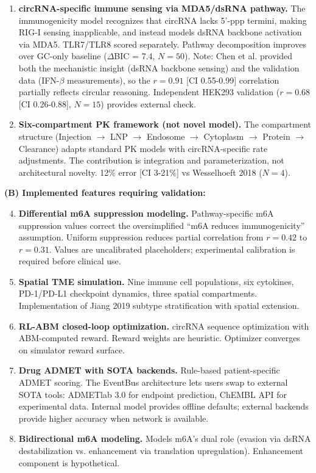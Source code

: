 \documentclass[11pt,a4paper]{article}
\begin{document}
\begin{enumerate}
\item \textbf{circRNA-specific immune sensing via MDA5/dsRNA pathway.} The immunogenicity model recognizes that circRNA lacks 5'-ppp termini, making RIG-I sensing inapplicable, and instead models dsRNA backbone activation via MDA5. TLR7/TLR8 scored separately. Pathway decomposition improves over GC-only baseline ($\Delta$BIC = 7.4, $N=50$). Note: Chen et al. \citep{chen2019} provided both the mechanistic insight (dsRNA backbone sensing) and the validation data (IFN-$\beta$ measurements), so the $r=0.91$ [CI 0.55-0.99] correlation partially reflects circular reasoning. Independent HEK293 validation ($r=0.68$ [CI 0.26-0.88], $N=15$) provides external check.

\item \textbf{Six-compartment PK framework (not novel model).} The compartment structure (Injection $\rightarrow$ LNP $\rightarrow$ Endosome $\rightarrow$ Cytoplasm $\rightarrow$ Protein $\rightarrow$ Clearance) adapts standard PK models with circRNA-specific rate adjustments. The contribution is integration and parameterization, not architectural novelty. 12\% error [CI 3-21\%] vs Wesselhoeft 2018 ($N=4$).
\end{enumerate}

\textbf{(B) Implemented features requiring validation:}

\begin{enumerate}
\setcounter{enumi}{3}
\item \textbf{Differential m6A suppression modeling.} Pathway-specific m6A suppression values correct the oversimplified ``m6A reduces immunogenicity'' assumption. Uniform suppression reduces partial correlation from $r=0.42$ to $r=0.31$. Values are uncalibrated placeholders; experimental calibration is required before clinical use.

\item \textbf{Spatial TME simulation.} Nine immune cell populations, six cytokines, PD-1/PD-L1 checkpoint dynamics, three spatial compartments. Implementation of Jiang 2019 subtype stratification with spatial extension.

\item \textbf{RL-ABM closed-loop optimization.} circRNA sequence optimization with ABM-computed reward. Reward weights are heuristic. Optimizer converges on simulator reward surface.

\item \textbf{Drug ADMET with SOTA backends.} Rule-based patient-specific ADMET scoring. The EventBus architecture lets users swap to external SOTA tools: ADMETlab 3.0 \citep{xiong2024} for endpoint prediction, ChEMBL API for experimental data. Internal model provides offline defaults; external backends provide higher accuracy when network is available.

\item \textbf{Bidirectional m6A modeling.} Models m6A's dual role (evasion via dsRNA destabilization vs. enhancement via translation upregulation). Enhancement component is hypothetical.
\end{enumerate}
\end{document}
